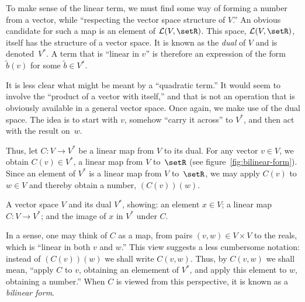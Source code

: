 \documentclass[10pt, a4paper]{article}
\begin{document}
To make sense of the linear term, we must find some way of forming a
number from a vector, while “respecting the vector space structure of
$V$.” An obvious candidate for such a map is an element of $\mathcal{L}(V,
\setR)$. This space, $\mathcal{L}(V, \setR)$, itself has the structure of a
vector space. It is known as the \emph{dual} of $V$ and is
denoted~$V^*$. A term that is “linear in $v$” is therefore an
expression of the form $\tilde{b}(v)$ for some $\tilde{b}\in V^*$.

It is less clear what might be meant by a “quadratic term.” It would
seem to involve the “product of a vector with itself,” and that is not
an operation that is obviously available in a general vector
space. Once again, we make use of the dual space. The idea is to start
with $v$, somehow “carry it across” to $V^*$, and then act with the
result on~$w$.

Thus, let $C\colon V\to V^*$ be a linear map from $V$ to its dual. For
any vector $v\in V$, we obtain $C(v)\in V^*$, a linear map from $V$
to~$\setR$ (see figure~\ref{fig:bilinear-form}). Since an element of $V^*$ is a linear map from $V$
to~$\setR$, we may apply $C(v)$ to $w\in V$ and thereby obtain a number,
$(C(v))(w)$. 

\begin{marginfigure}
  \begin{center}
  \end{center}
  \caption{A vector space $V$ and its dual $V^*$, showing: an element
    $x\in V$; a linear map $C\colon V\to V^*$; and the image of $x$ in
    $V^*$ under $C$.\label{fig:bilinear-form}}
\end{marginfigure}
In a sense, one may think of $C$ as a map, from pairs
$(v,w)\in V\times V$ to the reals, which is “linear in both $v$ and
$w$.” This view suggests a less cumbersome notation: instead of
$(C(v))(w)$ we shall write $C(v,w)$. Thus, by $C(v, w)$ we shall mean,
“apply $C$ to $v$, obtaining an elemement of $V^*$, and apply this
element to $w$, obtaining a number.” When $C$ is viewed from this
perspective, it is known as a \emph{bilinear form}.
\end{document}
